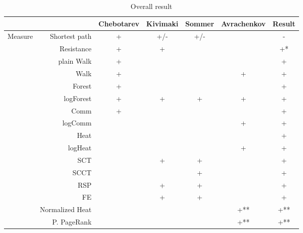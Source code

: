 \documentclass{article}
\begin{document}
\begin{table}[H]
\centering
\caption{Overall result}
\label{my-label}
\begin{tabular}{rr|cccc|c}
                &                          & Chebotarev & Kivimaki & Sommer & Avrachenkov & Result \\
                \hline
\multirow{18}{*}{Measure} & Shortest path  & +          & \cellcolor{red!25} +/- & \cellcolor{red!25} +/- & & \cellcolor{red!25} - \\
                & Resistance               & +          & +        &        &             &  \cellcolor{yellow!25} +* \\
                & plain Walk               & +          &          &        &             & +      \\
                & Walk                     & +          &          &        & +           & +      \\
                & Forest                   & +          &          &        &             & +      \\
                & logForest                & +          & +        & +      & +           & +      \\
                & Comm                     & +          &          &        &             & +      \\
                & logComm                  &            &          &        & +           & +      \\
                & Heat                     &            &          &        &             & \cellcolor{yellow!25} + \\
                & logHeat                  &            &          &        & +           & +      \\
                & SCT                      &            & +        & +      &             & +      \\
                & SCCT                     &            &          & +      &             & +      \\
                & RSP                      &            & +        & +      &             & +      \\
                & FE                       &            & +        & +      &             & +      \\
                & Normalized Heat          &            &          &        & +**         & \cellcolor{yellow!25} +** \\
                & P. PageRank              &            &          &        & +**         & \cellcolor{yellow!25} +** \\

\end{tabular}
\end{table}
\end{document}
